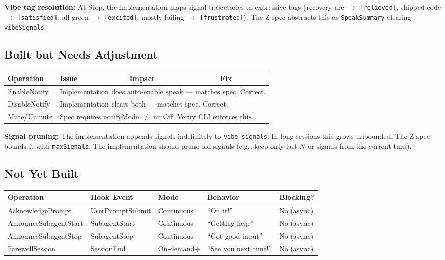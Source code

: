 \documentclass[a4paper,10pt,fleqn]{article}
\begin{document}
\textbf{Vibe tag resolution:} At Stop, the implementation maps signal
trajectories to expressive tags (recovery arc $\to$ \texttt{[relieved]},
shipped code $\to$ \texttt{[satisfied]}, all green $\to$
\texttt{[excited]}, mostly failing $\to$ \texttt{[frustrated]}). The Z
spec abstracts this as \texttt{SpeakSummary} clearing
\texttt{vibeSignals}.

\subsection{Built but Needs Adjustment}

\begin{tabular}{llll}
\hline
\textbf{Operation} & \textbf{Issue} & \textbf{Impact} & \textbf{Fix} \\
\hline
EnableNotify & \multicolumn{3}{l}{Implementation does auto-enable speak --- matches spec. Correct.} \\
DisableNotify & \multicolumn{3}{l}{Implementation clears both --- matches spec. Correct.} \\
Mute/Unmute & \multicolumn{3}{l}{Spec requires notifyMode $\neq$ nmOff. Verify CLI enforces this.} \\
\hline
\end{tabular}

\textbf{Signal pruning:} The implementation appends signals indefinitely
to \texttt{vibe\_signals}. In long sessions this grows unbounded. The Z
spec bounds it with \texttt{maxSignals}. The implementation should prune
old signals (e.g., keep only last $N$ or signals from the current turn).

\subsection{Not Yet Built}

\begin{tabular}{lllll}
\hline
\textbf{Operation} & \textbf{Hook Event} & \textbf{Mode} & \textbf{Behavior} & \textbf{Blocking?} \\
\hline
AcknowledgePrompt & UserPromptSubmit & Continuous & ``On it!'' & No (async) \\
AnnounceSubagentStart & SubagentStart & Continuous & ``Getting help'' & No (async) \\
AnnounceSubagentStop & SubagentStop & Continuous & ``Got good input'' & No (async) \\
FarewellSession & SessionEnd & On-demand+ & ``See you next time!'' & No (async) \\
\hline
\end{tabular}
\end{document}

